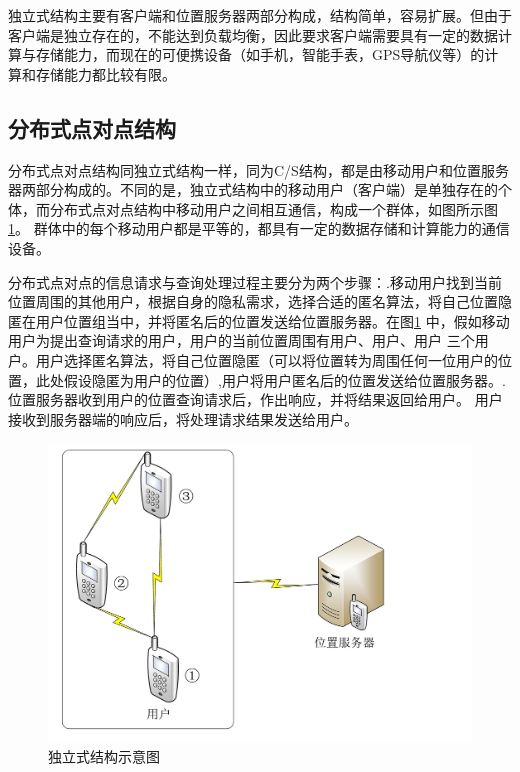 独立式结构主要有客户端和位置服务器两部分构成，结构简单，容易扩展。但由于客户端是独立存在的，不能达到负载均衡，因此要求客户端需要具有一定的数据计算与存储能力，而现在的可便携设备（如手机，智能手表，GPS导航仪等）的计算和存储能力都比较有限。
\subsection{分布式点对点结构}
分布式点对点结构\cite{Gruteser}同独立式结构一样，同为C/S结构，都是由移动用户和位置服务器两部分构成的。不同的是，独立式结构中的移动用户（客户端）是单独存在的个体，而分布式点对点结构中移动用户之间相互通信，构成一个群体，如图所示图\ref{fig:p2p_pdf}。 群体中的每个移动用户都是平等的，都具有一定的数据存储和计算能力的通信设备。

分布式点对点的信息请求与查询处理过程主要分为两个步骤：.移动用户找到当前位置周围的其他用户，根据自身的隐私需求，选择合适的匿名算法，将自己位置隐匿在用户位置组当中，并将匿名后的位置发送给位置服务器。在图\ref{fig:p2p_pdf} 中，假如移动用户为提出查询请求的用户，用户的当前位置周围有用户、用户、用户 三个用户。用户选择匿名算法，将自己位置隐匿（可以将位置转为周围任何一位用户的位置，此处假设隐匿为用户的位置）,用户将用户匿名后的位置发送给位置服务器。.位置服务器收到用户的位置查询请求后，作出响应，并将结果返回给用户。 用户 接收到服务器端的响应后，将处理请求结果发送给用户。


\begin{figure}[H]
\centering
\includegraphics[width=15 cm]{fig/p2p.pdf}
\caption{独立式结构示意图} %
\label{fig:p2p_pdf}
\end{figure}


